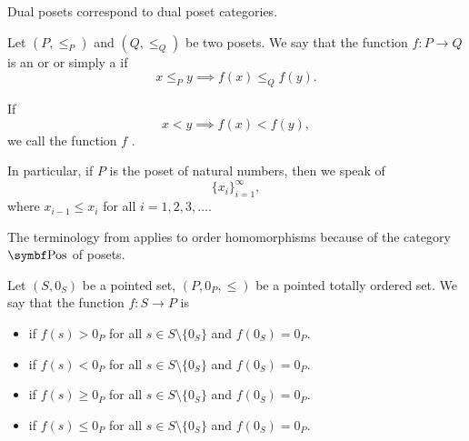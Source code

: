 \begin{proposition}\label{thm:dual_poset_dual_poset_category}
  Dual posets correspond to dual poset categories.
\end{proposition}

\begin{definition}\label{def:monotone_map}
  Let \( (P, \leq_P) \) and \( (Q, \leq_Q) \) be two posets. We say that the function \( f: P \to Q \) is an  or  or simply a  if
  \begin{equation*}
    x \leq_P y \implies f(x) \leq_Q f(y).
  \end{equation*}

  If
  \begin{equation*}
    x < y \implies f(x) < f(y),
  \end{equation*}
  we call the function \( f \) .

  In particular, if \( P \) is the poset of natural numbers, then we speak of 
  \begin{equation*}
    \{ x_i \}_{i=1}^\infty,
  \end{equation*}
  where \( x_{i-1} \leq x_i \) for all \( i = 1, 2, 3, \ldots \).

  The terminology from  applies to order homomorphisms because of the category \( \Cat{Pos} \) of posets.
\end{definition}

\begin{definition}\label{def:function_definiteness}
  Let \( (S, 0_S) \) be a pointed set, \( (P, 0_P, \leq) \) be a pointed totally ordered set. We say that the function \( f: S \to P \) is
  \begin{itemize}
    \item {} if \( f(s) > 0_P \) for all \( s \in S \setminus \{ 0_S \} \) and \( f(0_S) = 0_P \).
    \item {} if \( f(s) < 0_P \) for all \( s \in S \setminus \{ 0_S \} \) and \( f(0_S) = 0_P \).
    \item {} if \( f(s) \geq 0_P \) for all \( s \in S \setminus \{ 0_S \} \) and \( f(0_S) = 0_P \).
    \item {} if \( f(s) \leq 0_P \) for all \( s \in S \setminus \{ 0_S \} \) and \( f(0_S) = 0_P \).
  \end{itemize}
\end{definition}


